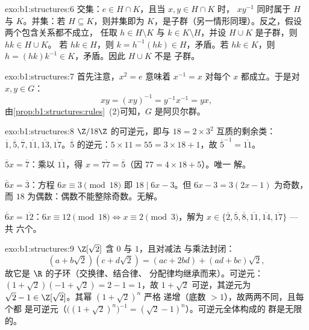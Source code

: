 \begin{solution}{exo:b1:structures:6}
交集：$e \in H \cap K$，且当 $x, y \in H \cap K$ 时，
$xy^{-1}$ 同时属于 $H$ 与 $K$。并集：若 $H \subseteq K$，则并集即为
$K$，是子群（另一情形同理）。反之，假设两个包含关系都不成立，
任取 $h \in H \setminus K$ 与 $k \in K \setminus
H$，并设 $H \cup K$ 是子群，则 $hk \in H \cup K$。
若 $hk \in H$，则 $k = h^{-1}(hk) \in H$，矛盾。若 $hk \in
K$，则 $h = (hk)k^{-1} \in K$，矛盾。因此 $H \cup K$ 不是
子群。
\end{solution}

\begin{solution}{exo:b1:structures:7}
首先注意，$x^2 = e$ 意味着 $x^{-1} = x$ 对每个 $x$ 都成立。于是对
$x, y \in G$：
\[
xy = (xy)^{-1} = y^{-1} x^{-1} = yx ,
\]
由\cref{prop:b1:structures:rules}~(2)可知，$G$ 是阿贝尔群。
\end{solution}

\begin{solution}{exo:b1:structures:8}
$\Z/18\Z$ 的可逆元，即与 $18 = 2 \times 3^2$ 互质的剩余类：
$\overline 1, \overline 5, \overline 7, \overline{11}, \overline{13},
\overline{17}$。$\overline 5$ 的逆元：$5 \times 11 = 55 = 3\times
18 + 1$，故 $\overline 5^{-1} = \overline{11}$。

$\overline 5 x = \overline 7$：乘以 $\overline{11}$，得 $x =
\overline{77} = \overline 5$（因 $77 = 4\times 18 + 5$）。唯一
解。

$\overline 6 x = \overline 3$：方程 $6x \equiv 3 \pmod{18}$
即 $18 \mid 6x - 3$。但 $6x - 3 = 3(2x - 1)$ 为奇数，而 $18$
为偶数：偶数不能整除奇数。无解。

$\overline 6 x = \overline{12}$：$6x \equiv 12 \pmod{18} \iff x
\equiv 2 \pmod 3$，解为 $x \in \{\overline 2, \overline 5,
\overline 8, \overline{11}, \overline{14}, \overline{17}\}$ --- 共
六个。
\end{solution}

\begin{solution}{exo:b1:structures:9}
$\Z[\sqrt 2]$ 含 $0$ 与 $1$，且对减法
与乘法封闭：
\[
(a + b\sqrt 2)(c + d\sqrt 2) = (ac + 2bd) + (ad + bc)\sqrt 2 ,
\]
故它是 $\R$ 的子环（交换律、结合律、
分配律均继承而来）。可逆元：$(1 + \sqrt 2)(-1 + \sqrt 2) =
2 - 1 = 1$，故 $1 + \sqrt 2$ 可逆，其逆元为 $\sqrt 2 - 1
\in \Z[\sqrt 2]$。其幂 $(1 + \sqrt 2)^n$ 严格
递增（底数 $> 1$），故两两不同，且每个都
是可逆元（$\bigl((1+\sqrt2)^n\bigr)^{-1} = (\sqrt 2 - 1)^n$）。可逆元全体构成的
群是无限的。
\end{solution}

